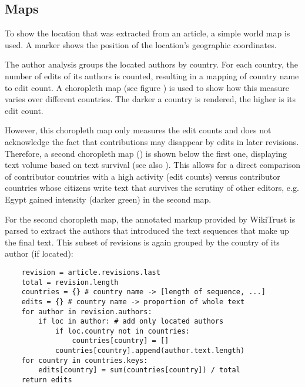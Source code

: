 \subsection{Maps}

To show the location that was extracted from an article, a simple world map is used.
A marker shows the position of the location's geographic coordinates.


The author analysis groups the located authors by country. 
For each country, the number of edits of its authors is counted, resulting in a mapping of country name to edit count.
A choropleth map (see figure ) is used to show how this measure varies over different countries.
The darker a country is rendered, the higher is its edit count.


However, this choropleth map only measures the edit counts and does not acknowledge the fact that contributions may disappear by edits in later revisions. 
Therefore, a second choropleth map () is shown below the first one, displaying text volume  based on text survival (see also ).
This allows for a direct comparison of contributor countries with a high activity (edit counts) versus contributor countries whose citizens write text that survives the scrutiny of other editors, e.g. Egypt gained intensity (darker green) in the second map.


For the second choropleth map, the annotated markup provided by WikiTrust is parsed to extract the authors that introduced the text sequences that make up the final text.
This subset of revisions is again grouped by the country of its author (if located):

\begin{lstlisting}
	revision = article.revisions.last
	total = revision.length
	countries = {} # country name -> [length of sequence, ...]
	edits = {} # country name -> proportion of whole text
	for author in revision.authors:
		if loc in author: # add only located authors
			if loc.country not in countries:
				countries[country] = []
			countries[country].append(author.text.length)
	for country in countries.keys:
		edits[country] = sum(countries[country]) / total
	return edits
\end{lstlisting}

